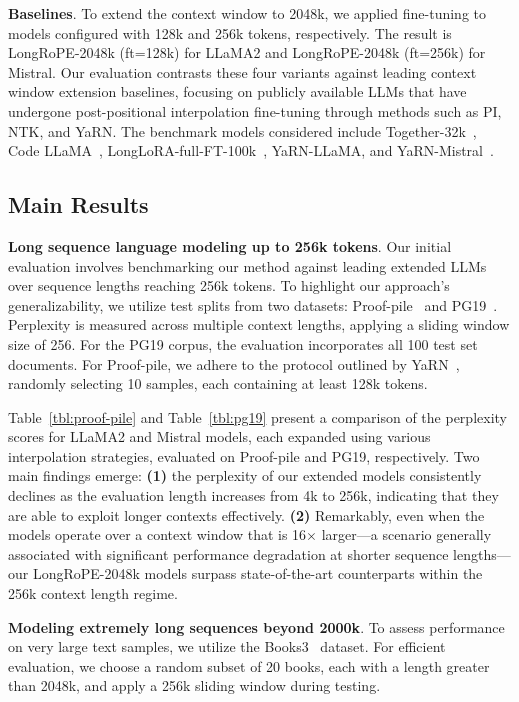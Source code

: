 \textbf{Baselines}. To extend the context window to 2048k, we applied fine-tuning to models configured with 128k and 256k tokens, respectively. The result is LongRoPE-2048k (ft=128k) for LLaMA2 and LongRoPE-2048k (ft=256k) for Mistral. Our evaluation contrasts these four variants against leading context window extension baselines, focusing on publicly available LLMs that have undergone post-positional interpolation fine-tuning through methods such as PI, NTK, and YaRN. The benchmark models considered include Together-32k~\cite{together}, Code LLaMA~\cite{codellama}, LongLoRA-full-FT-100k~\cite{longlora}, YaRN-LLaMA, and YaRN-Mistral~\cite{yarn}.

\subsection{Main Results}

\label{sec:mainresult}
\textbf{Long sequence language modeling up to 256k tokens}. Our initial evaluation involves benchmarking our method against leading extended LLMs over sequence lengths reaching 256k tokens. To highlight our approach's generalizability, we utilize test splits from two datasets: Proof-pile~\cite{pg19} and PG19~\cite{pile}. Perplexity is measured across multiple context lengths, applying a sliding window size of 256. For the PG19 corpus, the evaluation incorporates all 100 test set documents. For Proof-pile, we adhere to the protocol outlined by YaRN~\cite{yarn}, randomly selecting 10 samples, each containing at least 128k tokens.

Table~\ref{tbl:proof-pile} and Table~\ref{tbl:pg19} present a comparison of the perplexity scores for LLaMA2 and Mistral models, each expanded using various interpolation strategies, evaluated on Proof-pile and PG19, respectively. Two main findings emerge: \textbf{(1)} the perplexity of our extended models consistently declines as the evaluation length increases from 4k to 256k, indicating that they are able to exploit longer contexts effectively. \textbf{(2)} Remarkably, even when the models operate over a context window that is 16$\times$ larger—a scenario generally associated with significant performance degradation at shorter sequence lengths—our LongRoPE-2048k models surpass state-of-the-art counterparts within the 256k context length regime.

\textbf{Modeling extremely long sequences beyond 2000k}. To assess performance on very large text samples, we utilize the Books3~\cite{pile} dataset. For efficient evaluation, we choose a random subset of 20 books, each with a length greater than 2048k, and apply a 256k sliding window during testing.

